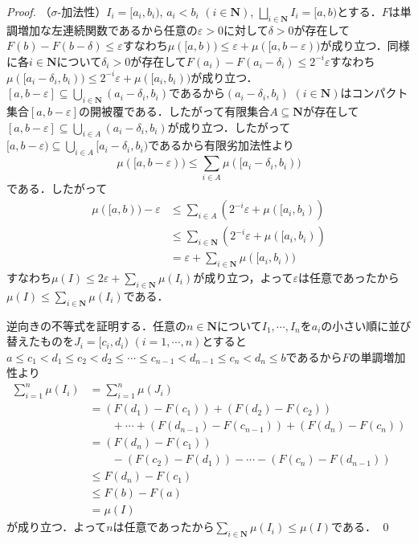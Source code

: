 \documentclass[12pt,a4paper]{jsarticle}
\newcommand{\nat}{\mathbf{N}}
\begin{document}
\begin{proof}
    （$\sigma$-加法性）$I_i = [a_i, b_i)$, $a_i < b_i$ $(i \in \nat)$, $\bigsqcup_{i \in \nat} I_i = [a, b)$とする．$F$は単調増加な左連続関数であるから任意の$\varepsilon > 0$に対して$\delta > 0$が存在して$F(b) - F(b - \delta) \leq \varepsilon$すなわち$\mu([a, b)) \leq \varepsilon + \mu([a, b - \varepsilon))$が成り立つ．同様に各$i \in \nat$について$\delta_i > 0$が存在して$F(a_i) - F(a_i - \delta_i) \leq 2^{-i}\varepsilon$すなわち$\mu([a_i - \delta_i, b_i)) \leq 2^{-i}\varepsilon + \mu([a_i, b_i))$が成り立つ．$[a, b - \varepsilon] \subseteq \bigcup_{i \in \nat} (a_i - \delta_i, b_i)$であるから$(a_i - \delta_i, b_i)$ $(i \in \nat)$はコンパクト集合$[a, b - \varepsilon]$の開被覆である．したがって有限集合$A \subseteq \nat$が存在して$[a, b - \varepsilon] \subseteq \bigcup_{i \in A} (a_i - \delta_i, b_i)$が成り立つ．したがって$[a, b - \varepsilon) \subseteq \bigcup_{i \in A} [a_i - \delta_i, b_i)$であるから有限劣加法性より
    \begin{equation*}
        \mu([a, b - \varepsilon)) \leq \sum_{i \in A} \mu([a_i - \delta_i, b_i))
    \end{equation*}
    である．したがって
    \begin{align*}
        \mu([a, b)) - \varepsilon 
        &\leq \sum_{i \in A} (2^{-i}\varepsilon + \mu([a_i, b_i)) \\
        &\leq \sum_{i \in \nat} (2^{-i}\varepsilon + \mu([a_i, b_i)) \\
        &= \varepsilon + \sum_{i \in \nat} \mu([a_i, b_i))
    \end{align*}
    すなわち$\mu(I) \leq 2\varepsilon + \sum_{i \in \nat} \mu(I_i)$が成り立つ，よって$\varepsilon$は任意であったから$\mu(I) \leq \sum_{i \in \nat} \mu(I_i)$である．

    逆向きの不等式を証明する．任意の$n \in \nat$について$I_1, \cdots, I_n$を$a_i$の小さい順に並び替えたものを$J_i = [c_i, d_i)$ $(i = 1, \cdots, n)$とすると$a \leq c_1 < d_1 \leq c_2 < d_2 \leq \cdots \leq c_{n - 1} < d_{n - 1} \leq c_n < d_n \leq b$であるから$F$の単調増加性より
    \begin{align*}
        \sum_{i = 1}^n \mu(I_i)
        &= \sum_{i = 1}^n \mu(J_i) \\
        &= (F(d_1) - F(c_1)) + (F(d_2) - F(c_2)) \\
        &\qquad + \cdots + (F(d_{n - 1}) - F(c_{n - 1})) + (F(d_n) - F(c_n)) \\
        &= (F(d_n) - F(c_1)) \\
        &\qquad - (F(c_2) - F(d_1)) - \cdots - (F(c_n) - F(d_{n - 1})) \\
        &\leq F(d_n) - F(c_1) \\
        &\leq F(b) - F(a) \\
        &= \mu(I)
    \end{align*}
    が成り立つ．よって$n$は任意であったから$\sum_{i \in \nat} \mu(I_i) \leq \mu(I)$である．
    \qed
\end{proof}
\end{document}
